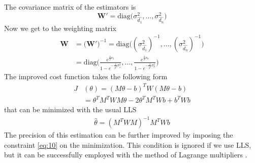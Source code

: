\documentclass[12pt,twoside]{report}
\begin{document}
The covariance matrix of the estimators is $$\mathbf{W}'=\text{diag}\big(\sigma^2_{\hat{d_1}},...,\sigma^2_{\hat{d_n}}\big)$$
Now we get to the weighting matrix
\begin{align}
    \mathbf{W}&=\big(\mathbf{W'}\big)^{-1}=\text{diag}\big((\sigma^2_{\hat{d_1}})^{-1},...,(\sigma^2_{\hat{d_n}})^{-1}\big)\\
    &=\text{diag}\bigg(\frac{e^{\frac{4}{\beta}\nu_1}}{1-e^{-\frac{4}{\beta^2}\sigma^2_1}},...,\frac{e^{\frac{4}{\beta}\nu_n}}{1-e^{-\frac{4}{\beta^2}\sigma^2_n}}\bigg)
\end{align}
The improved cost function \cite{rzk} takes the following form 
\begin{align}
    J&(\theta)=(M\theta - b)^TW(M\theta - b)\\
    &=\theta^TM^TWM\theta-2\theta^TM^TWb+b^TWb
\end{align}
that can be minimized with the usual LLS
\begin{align}
    \hat{\theta}=(M^TWM)^{-1}M^TWb
\end{align}
The precision of this estimation can be further improved by imposing the constraint \ref{eq:10} on the minimization. This condition is ignored if we use LLS, but it can be successfully employed with the method of Lagrange multipliers \cite{1275684,Lopez1994, pasa}.


\clearpage
\end{document}
